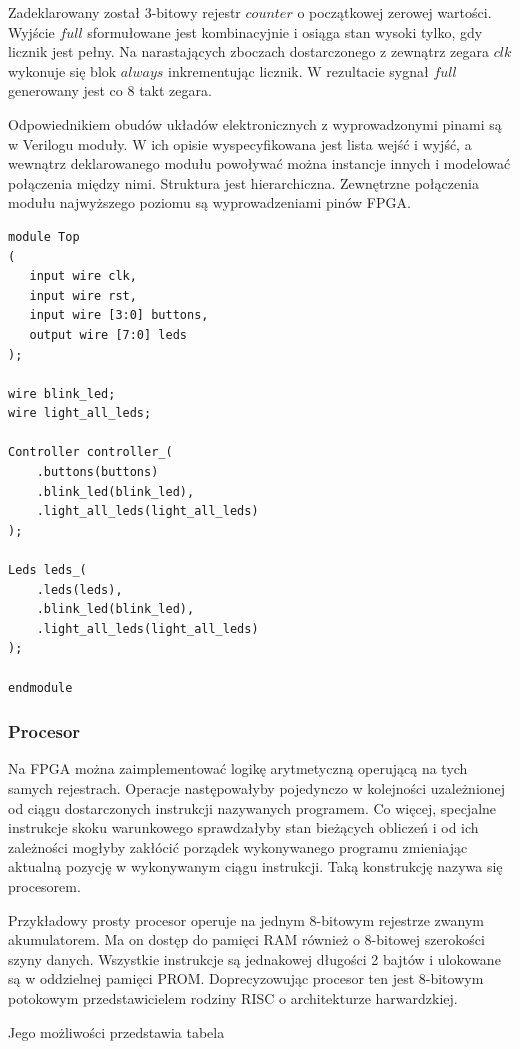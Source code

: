 \documentclass[a4paper,12pt]{article}
\begin{document}
Zadeklarowany został 3-bitowy rejestr $counter$ o początkowej zerowej wartości. Wyjście $full$ sformułowane jest kombinacyjnie i osiąga stan wysoki tylko, gdy licznik jest pełny. Na narastających zboczach dostarczonego z zewnątrz zegara $clk$ wykonuje się blok $always$ inkrementując licznik. W rezultacie sygnał $full$ generowany jest co 8 takt zegara.

Odpowiednikiem obudów układów elektronicznych z wyprowadzonymi pinami są w Verilogu moduły. W ich opisie wyspecyfikowana jest lista wejść i wyjść, a wewnątrz deklarowanego modułu powoływać można instancje innych i modelować połączenia między nimi. Struktura jest hierarchiczna. Zewnętrzne połączenia modułu najwyższego poziomu są wyprowadzeniami pinów FPGA.
\begin{lstlisting}[label=Top,caption=Top.v]
module Top
(
   input wire clk,
   input wire rst,
   input wire [3:0] buttons,
   output wire [7:0] leds
);

wire blink_led;
wire light_all_leds;

Controller controller_(
    .buttons(buttons)
    .blink_led(blink_led),
    .light_all_leds(light_all_leds)
);

Leds leds_(
    .leds(leds),
    .blink_led(blink_led),
    .light_all_leds(light_all_leds)
);

endmodule
\end{lstlisting}

\subsubsection{Procesor}

Na FPGA można zaimplementować logikę arytmetyczną operującą na tych samych rejestrach. Operacje następowałyby pojedynczo w kolejności uzależnionej od ciągu dostarczonych instrukcji nazywanych programem. Co więcej, specjalne instrukcje skoku warunkowego sprawdzałyby stan bieżących obliczeń i od ich zależności mogłyby zakłócić porządek wykonywanego programu zmieniając aktualną pozycję w wykonywanym ciągu instrukcji. Taką konstrukcję nazywa się procesorem.

Przykładowy prosty procesor operuje na jednym 8-bitowym rejestrze zwanym akumulatorem. Ma on dostęp do pamięci RAM również o 8-bitowej szerokości szyny danych. Wszystkie instrukcje są jednakowej długości 2 bajtów i ulokowane są w oddzielnej pamięci PROM. Doprecyzowując procesor ten jest 8-bitowym potokowym przedstawicielem rodziny RISC o architekturze harwardzkiej.

Jego możliwości przedstawia tabela
\end{document}
